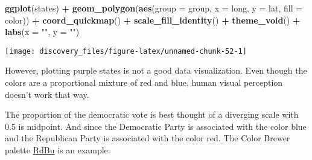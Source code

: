 \documentclass[]{book}
\newenvironment{Shaded}{\begin{snugshade}}{\end{snugshade}}
\newcommand{\DataTypeTok}[1]{\textcolor[rgb]{0.13,0.29,0.53}{#1}}
\newcommand{\DecValTok}[1]{\textcolor[rgb]{0.00,0.00,0.81}{#1}}
\newcommand{\KeywordTok}[1]{\textcolor[rgb]{0.13,0.29,0.53}{\textbf{#1}}}
\newcommand{\NormalTok}[1]{#1}
\newcommand{\OperatorTok}[1]{\textcolor[rgb]{0.81,0.36,0.00}{\textbf{#1}}}
\newcommand{\StringTok}[1]{\textcolor[rgb]{0.31,0.60,0.02}{#1}}
\theoremstyle{definition}
\theoremstyle{definition}
\theoremstyle{definition}
\theoremstyle{remark}
\begin{document}
\begin{Shaded}
\begin{Highlighting}[]
\KeywordTok{ggplot}\NormalTok{(states) }\OperatorTok{+}
\StringTok{  }\KeywordTok{geom_polygon}\NormalTok{(}\KeywordTok{aes}\NormalTok{(}\DataTypeTok{group =}\NormalTok{ group, }\DataTypeTok{x =}\NormalTok{ long, }\DataTypeTok{y =}\NormalTok{ lat,}
                   \DataTypeTok{fill =}\NormalTok{ color)) }\OperatorTok{+}
\StringTok{  }\KeywordTok{coord_quickmap}\NormalTok{() }\OperatorTok{+}
\StringTok{  }\KeywordTok{scale_fill_identity}\NormalTok{() }\OperatorTok{+}
\StringTok{  }\KeywordTok{theme_void}\NormalTok{() }\OperatorTok{+}
\StringTok{  }\KeywordTok{labs}\NormalTok{(}\DataTypeTok{x =} \StringTok{""}\NormalTok{, }\DataTypeTok{y =} \StringTok{""}\NormalTok{)}
\end{Highlighting}
\end{Shaded}

\begin{center}\texttt{[image: discovery\_files/figure-latex/unnamed-chunk-52-1]} \end{center}

However, plotting purple states is not a good data visualization. Even
though the colors are a proportional mixture of red and blue, human
visual perception doesn't work that way.

The proportion of the democratic vote is best thought of a diverging
scale with 0.5 is midpoint. And since the Democratic Party is associated
with the color blue and the Republican Party is associated with the
color red. The Color Brewer palette
\href{http://colorbrewer2.org/\#type=diverging\&scheme=RdBu\&n=11}{RdBu}
is an example:

\begin{Shaded}
\end{Shaded}
\end{document}
